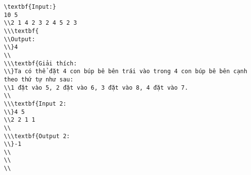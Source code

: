 \begin{verbatim}
\textbf{Input:}
10 5
\\2 1 4 2 3 2 4 5 2 3
\\\textbf{
\\Output:
\\}4
\\
\\\textbf{Giải thích: 
\\}Ta có thể đặt 4 con búp bê bên trái vào trong 4 con búp bê bên cạnh theo thứ tự như sau: 
\\1 đặt vào 5, 2 đặt vào 6, 3 đặt vào 8, 4 đặt vào 7.
\\
\\\textbf{Input 2:
\\}4 5
\\2 2 1 1
\\
\\\textbf{Output 2:
\\}-1
\\
\\
\\\end{verbatim}